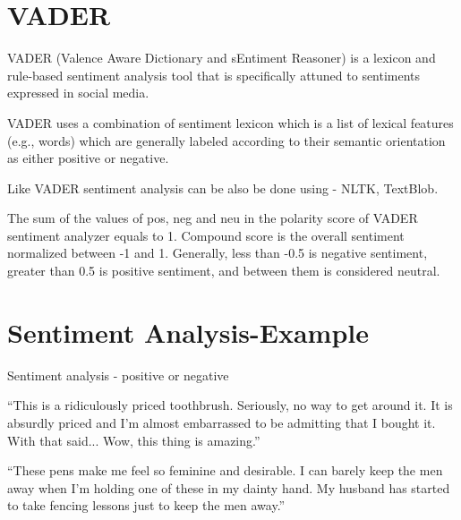 	\section{VADER}
	\begin{bulletedlist}
		\item VADER (Valence Aware Dictionary and sEntiment Reasoner) is a lexicon and rule-based sentiment analysis tool that is specifically attuned to sentiments expressed in social media.
		\item VADER uses a combination of sentiment lexicon which is a list of lexical features (e.g., words) which are generally labeled according to their semantic orientation as either positive or negative.
		\item Like VADER sentiment analysis can be also be done using - NLTK, TextBlob.
		\item The sum of the values of pos, neg and neu in the polarity score of VADER sentiment analyzer equals to 1. Compound score is the overall sentiment normalized between -1 and 1.  Generally, less than -0.5 is negative sentiment, greater than 0.5 is positive sentiment, and between them is considered neutral.
	\end{bulletedlist}


	\section{Sentiment Analysis-Example}
	\begin{bulletedlist}
		\item Sentiment analysis - positive or negative
		\begin{bulletedlist}
			\item ``This is a ridiculously priced toothbrush.  Seriously, no way to get around it. It is absurdly priced and I'm almost embarrassed to be admitting that I bought it.  With that said... Wow, this thing is amazing.''
			\item ``These pens make me feel so feminine and desirable. I can barely keep the men away when I'm holding one of these in my dainty hand.  My husband has started to take fencing lessons just to keep the men away.''
		\end{bulletedlist}
	\end{bulletedlist}


